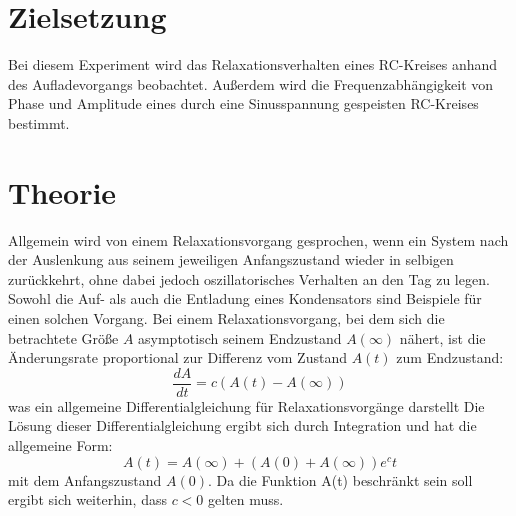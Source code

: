 \section{Zielsetzung}
Bei diesem Experiment wird das Relaxationsverhalten eines RC-Kreises anhand des Aufladevorgangs beobachtet. Außerdem wird die Frequenzabhängigkeit von Phase
und Amplitude eines durch eine Sinusspannung gespeisten RC-Kreises bestimmt.
\section{Theorie}
Allgemein wird von einem Relaxationsvorgang gesprochen, wenn ein System nach der Auslenkung aus seinem jeweiligen Anfangszustand wieder in selbigen 
zurückkehrt, ohne dabei jedoch oszillatorisches Verhalten an den Tag zu legen. Sowohl die Auf- als auch die Entladung eines Kondensators sind
Beispiele für einen solchen Vorgang. Bei einem Relaxationsvorgang, bei dem sich die betrachtete Größe $A$ asymptotisch seinem Endzustand $A(\infty)$
nähert, ist die Änderungsrate proportional zur Differenz vom Zustand $A(t)$ zum Endzustand:
\begin{equation*}
\frac{dA}{dt}=c(A(t)-A(\infty))
\end{equation*}
was ein allgemeine Differentialgleichung für Relaxationsvorgänge darstellt
Die Lösung dieser Differentialgleichung ergibt sich durch Integration und hat die allgemeine Form:
\begin{equation}
A(t)=A(\infty)+(A(0)+A(\infty))e^ct
\label{eq:allgemeine Relaxationsgleichung}
\end{equation}
mit dem Anfangszustand $A(0)$. Da die Funktion A(t) beschränkt sein soll ergibt sich weiterhin, dass $c<0$ gelten muss.
